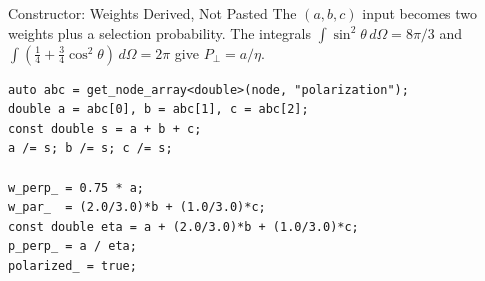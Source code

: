 \documentclass[11pt,aspectratio=169]{beamer}
\begin{document}
\begin{frame}[fragile]{Constructor: Weights Derived, Not Pasted}
The $(a,b,c)$ input becomes two weights plus a selection probability. The integrals
$\int\sin^2\theta\,d\Omega = 8\pi/3$ and $\int(\tfrac14+\tfrac34\cos^2\theta)\,d\Omega = 2\pi$
give $P_\perp = a/\eta$.
\begin{verbatim}
auto abc = get_node_array<double>(node, "polarization");
double a = abc[0], b = abc[1], c = abc[2];
const double s = a + b + c;
a /= s; b /= s; c /= s;

w_perp_ = 0.75 * a;
w_par_  = (2.0/3.0)*b + (1.0/3.0)*c;
const double eta = a + (2.0/3.0)*b + (1.0/3.0)*c;
p_perp_ = a / eta;
polarized_ = true;
\end{verbatim}
\end{frame}
\end{document}
